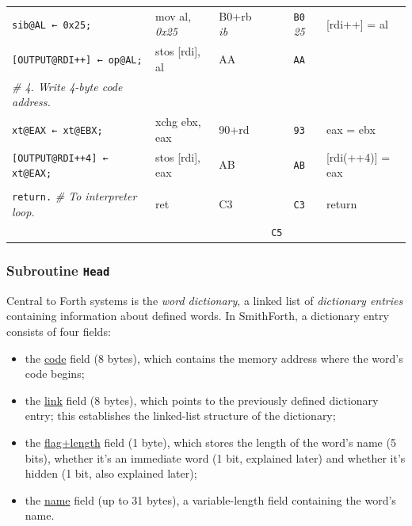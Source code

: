 \documentclass[a4paper,12pt,final]{article}
\begin{document}
\begin{table}[!htbp]
\begin{adjustwidth}{-1cm}{-1cm}
\begin{center}
\begin{tabular}{l|ll|l|lH}
\texttt{sib@AL ← 0x25;} & mov al, \emph{0x25} & B0+rb \emph{ib} &  & \texttt{B0} \emph{25} & [rdi++] = al\\[0pt]
\texttt{[OUTPUT@RDI++] ← op@AL;} & stos [rdi], al & AA &  & \texttt{AA} & \\[0pt]
\emph{\# 4. Write 4-byte code address.} &  &  &  &  & \\[0pt]
\texttt{xt@EAX ← xt@EBX;} & xchg ebx, eax & 90+rd &  & \texttt{93} & eax = ebx\\[0pt]
\texttt{[OUTPUT@RDI++4] ← xt@EAX;} & stos [rdi], eax & AB &  & \texttt{AB} & [rdi(++4)] = eax\\[0pt]
 &  &  &  &  & \\[0pt]
\texttt{return.}  \emph{\# To interpreter loop.} & ret & C3 &  & \texttt{C3} & return\\[0pt]
 &  &  & \texttt{C5} &  & \\[0pt]
\end{tabular}

\end{center}
\normalsize \end{adjustwidth} \end{table} \vspace{0}

\subsubsection{Subroutine \texttt{Head}}
\label{sec:org87a4500}

Central to Forth systems is the \emph{word dictionary}, a linked list of
\emph{dictionary entries} containing information about defined words.  In
SmithForth, a dictionary entry consists of four fields:
\begin{itemize}
\item the \uline{code} field (8 bytes), which contains the memory address where the word's
code begins;
\item the \uline{link} field (8 bytes), which points to the previously defined dictionary
entry; this establishes the linked-list structure of the dictionary;
\item the \uline{flag+length} field (1 byte), which stores the length of the
word's name (5 bits), whether it's an immediate word (1 bit, explained later) and
whether it's hidden (1 bit, also explained later);
\item the \uline{name} field (up to 31 bytes), a variable-length field
containing the word's name.
\end{itemize}
\end{document}
